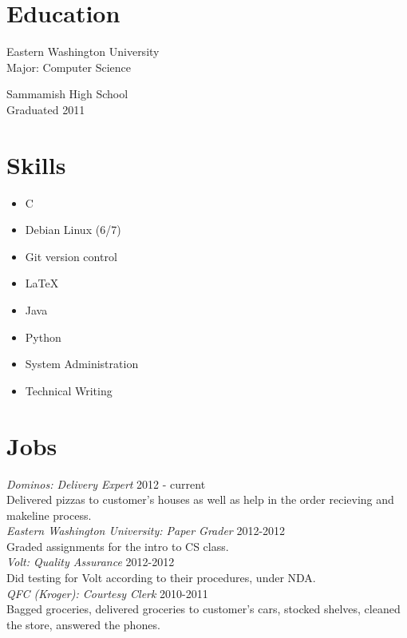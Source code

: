 \documentclass[line, margin, 12pt]{res}
\begin{document}
\address{12924 SE 26th ST \\ Bellevue WA, 98005 \\ +1 (425) 221-7761}
     
\begin{resume}
\section{Education}
Eastern Washington University \\
Major: Computer Science

Sammamish High School \\
Graduated 2011
     
\section{Skills}
\begin{itemize}
\item C
\item Debian Linux (6/7)
\item Git version control
\item \LaTeX
\item Java
\item Python
\item System Administration
\item Technical Writing
\end{itemize}
     
\section{Jobs}
\textit{Dominos: Delivery Expert} \hfill 2012 - current \\
Delivered pizzas to customer's houses as well as help in the order
recieving and makeline process. \\ [10pt]
\textit{Eastern Washington University: Paper Grader} \hfill 2012-2012 \\
Graded assignments for the intro to CS class. \\ [10pt]
\textit{Volt: Quality Assurance} \hfill 2012-2012 \\
Did testing for Volt according to their procedures, under NDA. \\ [10pt]
\textit{QFC (Kroger): Courtesy Clerk} \hfill 2010-2011 \\
Bagged groceries, delivered groceries to customer's cars, stocked
shelves, cleaned the store, answered the phones. \\ [10pt]


\end{resume}
\end{document}
